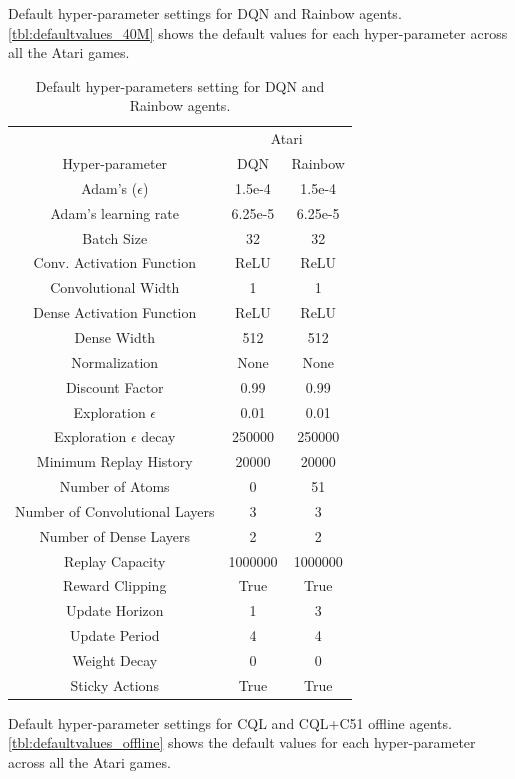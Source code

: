 {\newpage
Default hyper-parameter settings for DQN \citep{mnih2015humanlevel} and Rainbow \citep{Hessel2018RainbowCI} agents. \autoref{tbl:defaultvalues_40M} shows the default values for each hyper-parameter across all the Atari games. 


\begin{table}[!h]
 \centering
  \caption{Default hyper-parameters setting for DQN and Rainbow agents.}
  \label{tbl:defaultvalues_40M}
 \begin{tabular}{@{} ccc @{}}
    \toprule
    & \multicolumn{2}{c}{Atari}\\
    \cmidrule(lr){2-3}
  Hyper-parameter &  DQN & Rainbow \\
    \midrule
     Adam's ($\epsilon$) & 1.5e-4 & 1.5e-4\\
     Adam's learning rate &  6.25e-5 & 6.25e-5 \\
     Batch Size & 32 & 32\\
     Conv. Activation Function & ReLU & ReLU \\
     Convolutional Width & 1 & 1\\
     Dense Activation Function & ReLU & ReLU \\
     Dense Width & 512 & 512 \\
     Normalization & None & None \\
     Discount Factor & 0.99 & 0.99 \\
     Exploration $\epsilon$ & 0.01 & 0.01\\
     Exploration $\epsilon$ decay & 250000 & 250000\\
     Minimum Replay History & 20000 & 20000 \\
     Number of Atoms & 0 & 51 \\
     Number of Convolutional Layers & 3 & 3 \\
     Number of Dense Layers & 2 & 2\\
     Replay Capacity & 1000000 & 1000000  \\
     Reward Clipping & True & True \\
     Update Horizon & 1 & 3\\
     Update Period & 4 & 4   \\
     Weight Decay & 0 & 0 \\
     Sticky Actions & True & True\\
     \bottomrule
  \end{tabular}
\end{table}

\newpage
Default hyper-parameter settings for CQL \citep{kumar2020conservative} and CQL+C51 \citep{kumar2022offline} offline agents. \autoref{tbl:defaultvalues_offline} shows the default values for each hyper-parameter across all the Atari games. 


}
